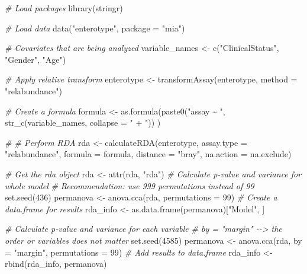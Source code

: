 \documentclass[
]{book}
\newenvironment{Shaded}{\begin{snugshade}}{\end{snugshade}}
\newcommand{\AttributeTok}[1]{\textcolor[rgb]{0.77,0.63,0.00}{#1}}
\newcommand{\CommentTok}[1]{\textcolor[rgb]{0.56,0.35,0.01}{\textit{#1}}}
\newcommand{\DecValTok}[1]{\textcolor[rgb]{0.00,0.00,0.81}{#1}}
\newcommand{\FunctionTok}[1]{\textcolor[rgb]{0.00,0.00,0.00}{#1}}
\newcommand{\NormalTok}[1]{#1}
\newcommand{\OtherTok}[1]{\textcolor[rgb]{0.56,0.35,0.01}{#1}}
\newcommand{\StringTok}[1]{\textcolor[rgb]{0.31,0.60,0.02}{#1}}
\begin{document}
\begin{Shaded}
\begin{Highlighting}[]
\CommentTok{\# Load packages}
\FunctionTok{library}\NormalTok{(stringr)}

\CommentTok{\# Load data}
\FunctionTok{data}\NormalTok{(}\StringTok{"enterotype"}\NormalTok{, }\AttributeTok{package =} \StringTok{"mia"}\NormalTok{)}

\CommentTok{\# Covariates that are being analyzed}
\NormalTok{variable\_names }\OtherTok{\textless{}{-}} \FunctionTok{c}\NormalTok{(}\StringTok{"ClinicalStatus"}\NormalTok{, }\StringTok{"Gender"}\NormalTok{, }\StringTok{"Age"}\NormalTok{)}

\CommentTok{\# Apply relative transform}
\NormalTok{enterotype }\OtherTok{\textless{}{-}} \FunctionTok{transformAssay}\NormalTok{(enterotype, }\AttributeTok{method =} \StringTok{"relabundance"}\NormalTok{)}

\CommentTok{\# Create a formula}
\NormalTok{formula }\OtherTok{\textless{}{-}} \FunctionTok{as.formula}\NormalTok{(}\FunctionTok{paste0}\NormalTok{(}\StringTok{"assay \textasciitilde{} "}\NormalTok{, }\FunctionTok{str\_c}\NormalTok{(variable\_names, }\AttributeTok{collapse =} \StringTok{" + "}\NormalTok{)) )}

\CommentTok{\# \# Perform RDA}
\NormalTok{rda }\OtherTok{\textless{}{-}} \FunctionTok{calculateRDA}\NormalTok{(enterotype,}
                    \AttributeTok{assay.type =} \StringTok{"relabundance"}\NormalTok{,}
                    \AttributeTok{formula =}\NormalTok{ formula,}
                    \AttributeTok{distance =} \StringTok{"bray"}\NormalTok{,}
                    \AttributeTok{na.action =}\NormalTok{ na.exclude)}

\CommentTok{\# Get the rda object}
\NormalTok{rda }\OtherTok{\textless{}{-}} \FunctionTok{attr}\NormalTok{(rda, }\StringTok{"rda"}\NormalTok{)}
\CommentTok{\# Calculate p{-}value and variance for whole model}
\CommentTok{\# Recommendation: use 999 permutations instead of 99}
\FunctionTok{set.seed}\NormalTok{(}\DecValTok{436}\NormalTok{)}
\NormalTok{permanova }\OtherTok{\textless{}{-}} \FunctionTok{anova.cca}\NormalTok{(rda, }\AttributeTok{permutations =} \DecValTok{99}\NormalTok{)}
\CommentTok{\# Create a data.frame for results}
\NormalTok{rda\_info }\OtherTok{\textless{}{-}} \FunctionTok{as.data.frame}\NormalTok{(permanova)[}\StringTok{"Model"}\NormalTok{, ]}

\CommentTok{\# Calculate p{-}value and variance for each variable}
\CommentTok{\# by = "margin" {-}{-}\textgreater{} the order or variables does not matter}
\FunctionTok{set.seed}\NormalTok{(}\DecValTok{4585}\NormalTok{)}
\NormalTok{permanova }\OtherTok{\textless{}{-}} \FunctionTok{anova.cca}\NormalTok{(rda, }\AttributeTok{by =} \StringTok{"margin"}\NormalTok{,  }\AttributeTok{permutations =} \DecValTok{99}\NormalTok{)}
\CommentTok{\# Add results to data.frame}
\NormalTok{rda\_info }\OtherTok{\textless{}{-}} \FunctionTok{rbind}\NormalTok{(rda\_info, permanova)}


\end{Highlighting}
\end{Shaded}
\end{document}
